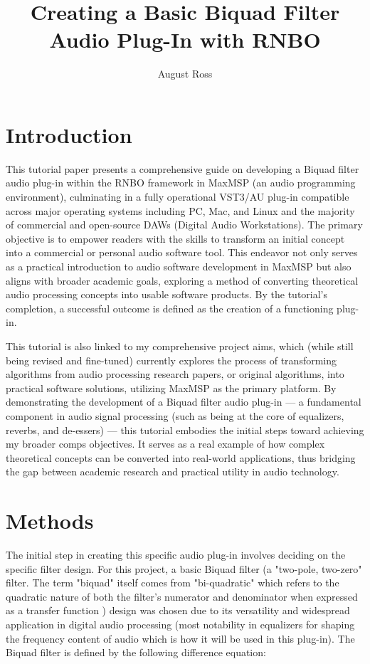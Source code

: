 \documentclass[10pt,twocolumn]{article}
\title{Creating a Basic Biquad Filter Audio Plug-In with RNBO}
\author{August Ross}
\affiliation{Occidental College}
\begin{document}
\maketitle

\section{Introduction}

This tutorial paper presents a comprehensive guide on developing a Biquad filter audio plug-in within the RNBO \cite{RNBO} framework in MaxMSP (an audio programming environment), culminating in a fully operational VST3/AU plug-in compatible across major operating systems including PC, Mac, and Linux and the majority of commercial and open-source DAWs (Digital Audio Workstations). The primary objective is to empower readers with the skills to transform an initial concept into a commercial or personal audio software tool. This endeavor not only serves as a practical introduction to audio software development in MaxMSP but also aligns with broader academic goals, exploring a method of converting theoretical audio processing concepts into usable software products. By the tutorial's completion, a successful outcome is defined as the creation of a functioning plug-in.

This tutorial is also linked to my comprehensive project aims, which (while still being revised and fine-tuned) currently explores the process of transforming algorithms from audio processing research papers, or original algorithms, into practical software solutions, utilizing MaxMSP as the primary platform. By demonstrating the development of a Biquad filter audio plug-in — a fundamental component in audio signal processing (such as being at the core of equalizers, reverbs, and de-essers) — this tutorial embodies the initial steps toward achieving my broader comps objectives. It serves as a real example of how complex theoretical concepts can be converted into real-world applications, thus bridging the gap between academic research and practical utility in audio technology.

\section{Methods}

The initial step in creating this specific audio plug-in involves deciding on the specific filter design. For this project, a basic Biquad filter (a "two-pole, two-zero" filter. The term "biquad" itself comes from "bi-quadratic" which refers to the quadratic nature of both the filter's numerator and denominator when expressed as a transfer function \cite{Smith}) design was chosen due to its versatility and widespread application in digital audio processing (most notability in equalizers for shaping the frequency content of audio which is how it will be used in this plug-in). The Biquad filter is defined by the following difference equation:
\end{document}
